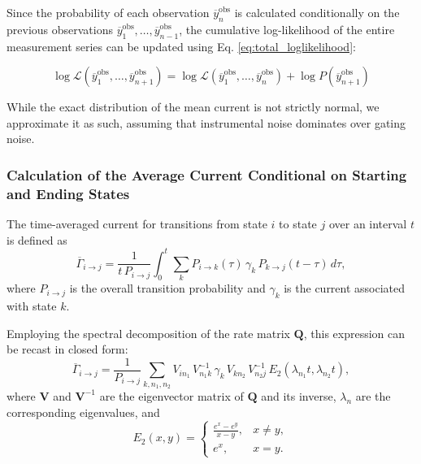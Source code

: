 \documentclass[pdflatex,sn-mathphys-num]{sn-jnl}%
\theoremstyle{thmstyleone}%
\theoremstyle{thmstyletwo}%
\theoremstyle{thmstylethree}%
\begin{document}
Since the probability of each observation \( \overline{y}_n^{\text{obs}} \) is calculated conditionally on the previous observations \( \overline{y}_1^{\text{obs}}, \dots, \overline{y}_{n-1}^{\text{obs}} \), the cumulative log-likelihood of the entire measurement series can be updated using Eq. \ref{eq:total_loglikelihood}:

\begin{equation}
	\log \mathcal{L}(\overline{y}_1^{\text{obs}}, \dots, \overline{y}_{n+1}^{\text{obs}}) = \log \mathcal{L}(\overline{y}_1^{\text{obs}}, \dots, \overline{y}_n^{\text{obs}}) + \log P(\overline{y}_{n+1}^{\text{obs}})
	\label{eq:single_channel_integrated_total_likelihood}
\end{equation}

While the exact distribution of the mean current is not strictly normal, we approximate it as such, assuming that instrumental noise dominates over gating noise.

\subsubsection{Calculation of the Average Current Conditional on Starting and Ending States}

The time-averaged current for transitions from state \(i\) to state \(j\) over an interval \(t\) is defined as
\begin{equation}
	\overline{\Gamma}_{i \rightarrow j} = \frac{1}{t\,P_{i\rightarrow j}} \int_0^t \sum_k P_{i\rightarrow k}(\tau)\,\gamma_k\,P_{k\rightarrow j}(t-\tau)\,d\tau,
	\label{eq:gamma_ij_integral_short}
\end{equation}
where \(P_{i\rightarrow j}\) is the overall transition probability and \(\gamma_k\) is the current associated with state \(k\).

Employing the spectral decomposition of the rate matrix \(\mathbf{Q}\), this expression can be recast in closed form:
\begin{equation}
	\overline{\Gamma}_{i \rightarrow j} = \frac{1}{P_{i\rightarrow j}} \sum_{k, n_1, n_2} V_{i n_1}\,V^{-1}_{n_1 k}\,\gamma_k\,V_{k n_2}\,V^{-1}_{n_2 j}\,E_2(\lambda_{n_1}t,\lambda_{n_2}t),
	\label{eq:gamma_ij_formula_short}
\end{equation}
where \(\mathbf{V}\) and \(\mathbf{V}^{-1}\) are the eigenvector matrix of \(\mathbf{Q}\) and its inverse, \(\lambda_{n}\) are the corresponding eigenvalues, and
\begin{equation}
	E_2(x,y)=
	\begin{cases}
		\frac{e^x-e^y}{x-y}, & x\neq y, \\
		e^x, & x=y.
	\end{cases}
	\label{eq:E2_short}
\end{equation}
\end{document}
